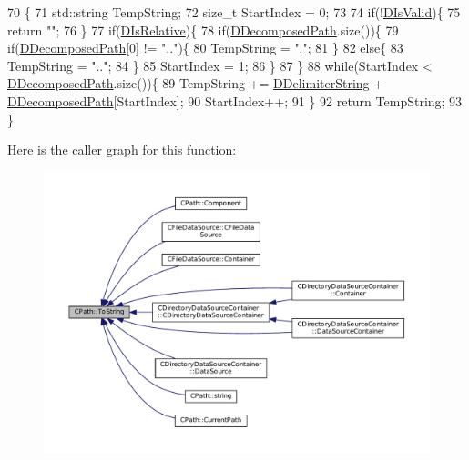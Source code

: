 \begin{DoxyCode}
70                                \{
71     std::string TempString;
72     \textcolor{keywordtype}{size\_t} StartIndex = 0;
73     
74     \textcolor{keywordflow}{if}(!\hyperlink{classCPath_a992aca27a1cba1c3bae3d04438821192}{DIsValid})\{
75         \textcolor{keywordflow}{return} \textcolor{stringliteral}{""};    
76     \}
77     \textcolor{keywordflow}{if}(\hyperlink{classCPath_af705ff149bb2281c67afb84fff550eb9}{DIsRelative})\{
78         \textcolor{keywordflow}{if}(\hyperlink{classCPath_a03ed25209a01e633c107a0c877fc61f8}{DDecomposedPath}.size())\{
79             \textcolor{keywordflow}{if}(\hyperlink{classCPath_a03ed25209a01e633c107a0c877fc61f8}{DDecomposedPath}[0] != \textcolor{stringliteral}{".."})\{
80                 TempString = \textcolor{stringliteral}{"."};   
81             \}
82             \textcolor{keywordflow}{else}\{
83                 TempString = \textcolor{stringliteral}{".."};
84             \}
85             StartIndex = 1;
86         \}
87     \}
88     \textcolor{keywordflow}{while}(StartIndex < \hyperlink{classCPath_a03ed25209a01e633c107a0c877fc61f8}{DDecomposedPath}.size())\{
89         TempString += \hyperlink{classCPath_a88b8652d01ff3359a48dd75126cc5776}{DDelimiterString} + \hyperlink{classCPath_a03ed25209a01e633c107a0c877fc61f8}{DDecomposedPath}[StartIndex];
90         StartIndex++;
91     \}
92     \textcolor{keywordflow}{return} TempString;
93 \}
\end{DoxyCode}
Here is the caller graph for this function\+:
\nopagebreak
\begin{figure}[H]
\begin{center}
\leavevmode
\includegraphics[width=350pt]{classCPath_abbafaf377a7e38e0151bd9567d526951_icgraph}
\end{center}
\end{figure}


